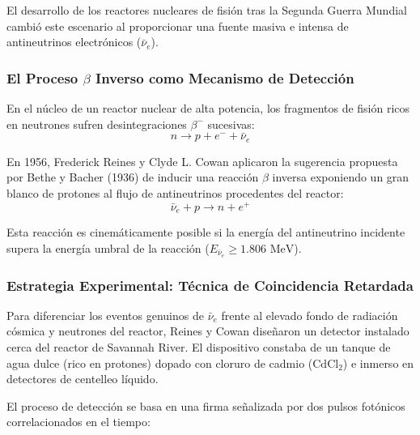 El desarrollo de los reactores nucleares de fisión tras la Segunda Guerra Mundial cambió este escenario al proporcionar una fuente masiva e intensa de antineutrinos electrónicos ($\bar{\nu}_e$).

\subsubsection{El Proceso $\beta$ Inverso como Mecanismo de Detección}

En el núcleo de un reactor nuclear de alta potencia, los fragmentos de fisión ricos en neutrones sufren desintegraciones $\beta^-$ sucesivas:
\begin{equation}
n \longrightarrow p + e^- + \bar{\nu}_e
\end{equation}

En 1956, Frederick Reines y Clyde L. Cowan aplicaron la sugerencia propuesta por Bethe y Bacher (1936) de inducir una reacción $\beta$ inversa exponiendo un gran blanco de protones al flujo de antineutrinos procedentes del reactor:
\begin{equation}
\label{eq:beta_inversa}
\bar{\nu}_e + p \longrightarrow n + e^+
\end{equation}

Esta reacción es cinemáticamente posible si la energía del antineutrino incidente supera la energía umbral de la reacción ($E_{\bar{\nu}_e} \ge 1.806 \text{ MeV}$).

\subsubsection{Estrategia Experimental: Técnica de Coincidencia Retardada}

Para diferenciar los eventos genuinos de $\bar{\nu}_e$ frente al elevado fondo de radiación cósmica y neutrones del reactor, Reines y Cowan diseñaron un detector instalado cerca del reactor de Savannah River. El dispositivo constaba de un tanque de agua dulce (rico en protones) dopado con cloruro de cadmio ($\text{CdCl}_2$) e inmerso en detectores de centelleo líquido.

El proceso de detección se basa en una firma señalizada por dos pulsos fotónicos correlacionados en el tiempo:

